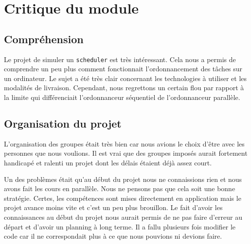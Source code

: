 \chapter{Critique du module}

    \section{Compréhension}
    
    Le projet de simuler un \texttt{scheduler} est très intéressant. Cela nous a permis de comprendre un peu plus comment fonctionnait l'ordonnancement des tâches sur un ordinateur. Le sujet a été très clair concernant les technologies à utiliser et les modalités de livraison. Cependant, nous regrettons un certain flou par rapport à la limite qui différenciait l'ordonnanceur séquentiel de l'ordonnanceur parallèle.
    
    \section{Organisation du projet}
    
    L'organisation des groupes était très bien car nous avions le choix d'être avec les personnes que nous voulions. Il est vrai que des groupes imposés aurait fortement handicapé et ralenti un projet dont les délais étaient déjà assez court. \newline
    
    Un des problèmes était qu'au début du projet nous ne connaissions rien et nous avons fait les cours en parallèle. Nous ne pensons pas que cela soit une bonne stratégie. Certes, les compétences sont mises directement en application mais le projet avance moins vite et c'est un peu plus brouillon. Le fait d'avoir les connaissances au début du projet nous aurait permis de ne pas faire d'erreur au départ et d'avoir un planning à long terme. Il a fallu plusieurs fois modifier le code car il ne correspondait plus à ce que nous pouvions ni devions faire.